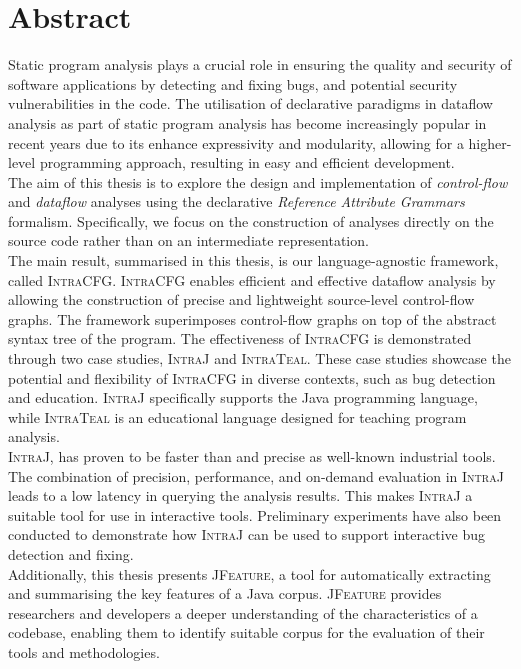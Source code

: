 \chapter{Abstract}


Static program analysis plays a crucial role in ensuring the quality and security of
software applications by detecting and fixing bugs,
and potential security vulnerabilities in the code. The utilisation of declarative
paradigms in dataflow analysis as part of static program analysis has become 
increasingly popular in recent years due to its enhance expressivity 
and modularity, allowing for a higher-level programming approach, resulting in
easy and efficient development.\\[5pt]

The aim of this thesis is to explore the design and implementation of \emph{control-flow} and 
\emph{dataflow} analyses using the declarative \emph{Reference Attribute Grammars} formalism.
Specifically, we focus on the construction of analyses directly on the source code
rather than on an intermediate representation.\\[5pt]

The main result, summarised in this thesis, is our language-agnostic framework, called \textsc{IntraCFG}.
\textsc{IntraCFG} enables efficient and effective dataflow analysis by allowing the construction of precise and
lightweight source-level control-flow graphs. The framework superimposes control-flow
graphs on top of the abstract syntax tree of the program. 
The effectiveness of \textsc{IntraCFG} is demonstrated through two case studies, 
\textsc{IntraJ} and \textsc{IntraTeal}. These case studies showcase the potential and 
flexibility of \textsc{IntraCFG} in diverse contexts, such as bug detection and education. 
\textsc{IntraJ} specifically supports the Java programming language, while 
\textsc{IntraTeal} is an educational language designed for teaching program analysis.\\[5pt]

\textsc{IntraJ}, has proven to be faster than and precise as well-known
industrial tools. 
The combination of precision, performance, and on-demand evaluation in \textsc{IntraJ} 
leads to a low latency in querying the analysis results. This makes \textsc{IntraJ} a
suitable tool for use in interactive tools. Preliminary experiments have also 
been conducted to demonstrate how \textsc{IntraJ} can be used to support interactive
bug detection and fixing.\\[5pt]

Additionally, this thesis presents \textsc{JFeature}, a tool for automatically extracting
and summarising the key features of a Java corpus. \textsc{JFeature} provides 
researchers and developers a deeper understanding of the characteristics of 
a codebase, enabling them to identify suitable corpus for the evaluation of their 
tools and methodologies.
